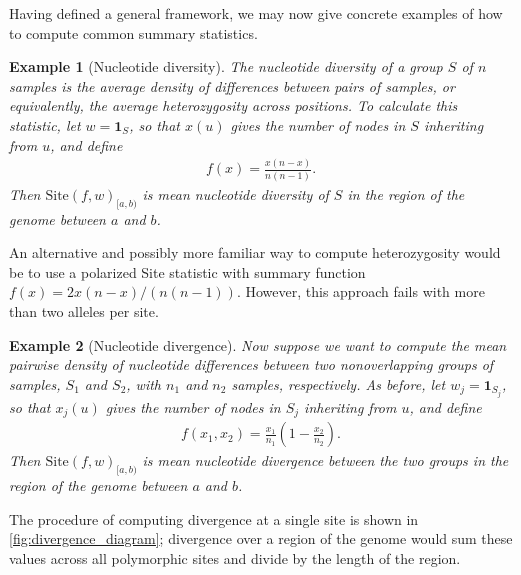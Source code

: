 \documentclass[9pt,twoside,lineno]{gsajnl}
\newcommand{\bone}{\mathbf{1}}
\newtheorem{example}{Example}
\newcommand{\site}{\mbox{Site}} %
\newcommand{\iw}{w} %
\newcommand{\nw}{x} %
\begin{document}
Having defined a general framework, we may now give concrete examples
of how to compute common summary statistics.

\begin{example}[Nucleotide diversity] \label{ex:site_diversity}
    The nucleotide diversity of a group $S$ of $n$ samples
    is the average density of differences between pairs of samples,
    or equivalently, the average heterozygosity across positions.
    To calculate this statistic,
    let $\iw = \bone_S$,
    so that $\nw(u)$ gives the number of nodes in $S$ inheriting from $u$,
    and define
    \begin{align*}
        f(x) = \frac{x (n - x)}{n (n-1)} .
    \end{align*}
    Then $\site(f, \iw)_{[a,b)}$ is mean nucleotide diversity of $S$
    in the region of the genome between $a$ and $b$.
\end{example}

An alternative and possibly more familiar way to compute heterozygosity
would be to use a polarized Site statistic with summary function $f(x) = 2
x(n-x)/\left(n(n-1)\right)$.
However, this approach fails with more than two alleles per site.

\begin{example}[Nucleotide divergence] \label{ex:site_divergence}
    Now suppose we want to compute the mean pairwise density of nucleotide differences
    \emph{between} two nonoverlapping groups of samples, $S_1$ and $S_2$,
    with $n_1$ and $n_2$ samples, respectively.
    As before,
    let $\iw_j = \bone_{S_j}$,
    so that $\nw_{j}(u)$ gives the number of nodes in $S_j$ inheriting from $u$,
    and define
    \begin{align*}
        f(x_1, x_2) = \frac{x_1}{n_1} \left(1 - \frac{x_2}{n_2}\right) .
    \end{align*}
    Then $\site(f, \iw)_{[a,b)}$ is mean nucleotide divergence between the two groups
    in the region of the genome between $a$ and $b$.
\end{example}

The procedure of computing divergence at a single site is shown in \autoref{fig:divergence_diagram};
divergence over a region of the genome would sum these values across all polymorphic sites
and divide by the length of the region.
\end{document}
